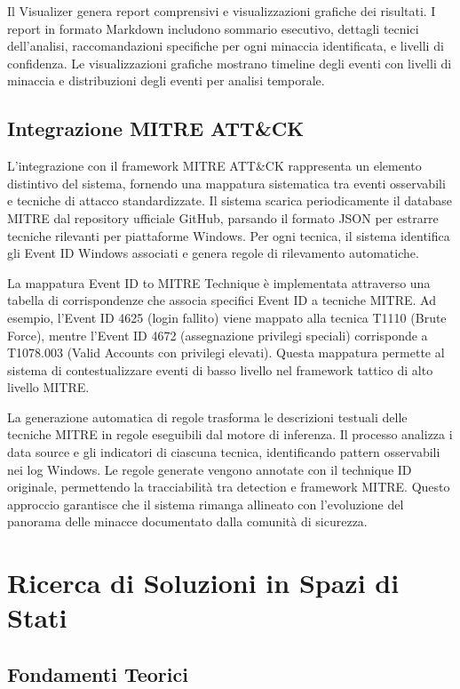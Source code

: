 \documentclass[12pt,a4paper]{report}
\theoremstyle{definition}
\begin{document}
Il Visualizer genera report comprensivi e visualizzazioni grafiche dei risultati. I report in formato Markdown includono sommario esecutivo, dettagli tecnici dell'analisi, raccomandazioni specifiche per ogni minaccia identificata, e livelli di confidenza. Le visualizzazioni grafiche mostrano timeline degli eventi con livelli di minaccia e distribuzioni degli eventi per analisi temporale.

\section{Integrazione MITRE ATT\&CK}

L'integrazione con il framework MITRE ATT\&CK rappresenta un elemento distintivo del sistema, fornendo una mappatura sistematica tra eventi osservabili e tecniche di attacco standardizzate. Il sistema scarica periodicamente il database MITRE dal repository ufficiale GitHub, parsando il formato JSON per estrarre tecniche rilevanti per piattaforme Windows. Per ogni tecnica, il sistema identifica gli Event ID Windows associati e genera regole di rilevamento automatiche.

La mappatura Event ID to MITRE Technique è implementata attraverso una tabella di corrispondenze che associa specifici Event ID a tecniche MITRE. Ad esempio, l'Event ID 4625 (login fallito) viene mappato alla tecnica T1110 (Brute Force), mentre l'Event ID 4672 (assegnazione privilegi speciali) corrisponde a T1078.003 (Valid Accounts con privilegi elevati). Questa mappatura permette al sistema di contestualizzare eventi di basso livello nel framework tattico di alto livello MITRE.

La generazione automatica di regole trasforma le descrizioni testuali delle tecniche MITRE in regole eseguibili dal motore di inferenza. Il processo analizza i data source e gli indicatori di ciascuna tecnica, identificando pattern osservabili nei log Windows. Le regole generate vengono annotate con il technique ID originale, permettendo la tracciabilità tra detection e framework MITRE. Questo approccio garantisce che il sistema rimanga allineato con l'evoluzione del panorama delle minacce documentato dalla comunità di sicurezza.

\chapter{Ricerca di Soluzioni in Spazi di Stati}

\section{Fondamenti Teorici}
\end{document}
